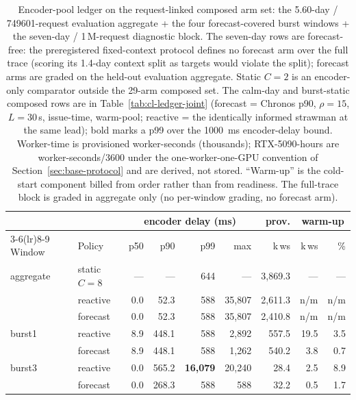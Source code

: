 \begin{table}[htbp]
\centering
\caption[Encoder-pool ledger, request-linked composed arm set]{Encoder-pool
ledger on the request-linked composed arm set: the 5.60-day /
\num{749601}-request evaluation aggregate + the four forecast-covered
burst windows + the seven-day / 1\,M-request diagnostic block. The
seven-day rows are forecast-free: the preregistered fixed-context
protocol defines no forecast arm over the full trace (scoring its
1.4-day context split as targets would violate the split); forecast arms
are graded on the held-out evaluation aggregate. Static $C{=}2$ is an
encoder-only comparator outside the 29-arm composed set. The calm-day
and burst-static composed
rows are in Table~\ref{tab:cl-ledger-joint} (forecast = Chronos p90, $\rho{=}15$,
$L{=}30$\,\si{\second}, issue-time, warm-pool; reactive = the identically
informed strawman at the same lead); bold marks a p99 over the
\SI{1000}{\milli\second} encoder-delay bound. Worker-time is provisioned
worker-seconds (thousands); RTX-5090-hours are worker-seconds/3600 under the
one-worker-one-GPU convention of Section~\ref{sec:base-protocol} and are
derived, not stored. ``Warm-up'' is the cold-start component billed from order
rather than from readiness. The full-trace block is graded in aggregate only
(no per-window grading, no forecast arm).}
\label{tab:cl-ledger-enc}
\footnotesize
\setlength{\tabcolsep}{3pt}
\begin{tabular}{@{}llrrrrrrr@{}}
\toprule
& & \multicolumn{4}{c}{encoder delay (\si{\milli\second})} & prov. &
\multicolumn{2}{c}{warm-up} \\
\cmidrule(lr){3-6}\cmidrule(lr){8-9}
Window & Policy & p50 & p90 & p99 & max & k\,ws & k\,ws & \% \\
\midrule
aggregate & static $C{=}8$ & --- & --- & 644 & --- & 3{,}869.3 & --- & --- \\
          & reactive       & 0.0 & 52.3 & 588 & 35{,}807 & 2{,}611.3 & n/m & n/m \\
          & forecast       & 0.0 & 52.3 & 588 & 35{,}807 & 2{,}410.8 & n/m & n/m \\
\midrule
burst1 & reactive & 8.9 & 448.1 & 588 & 2{,}892 & 557.5 & 19.5 & 3.5 \\
       & forecast & 8.9 & 448.1 & 588 & 1{,}262 & 540.2 & 3.8 & 0.7 \\
burst3 & reactive & 0.0 & 565.2 & \textbf{16{,}079} & 20{,}240 & 28.4 & 2.5 & 8.9 \\
       & forecast & 0.0 & 268.3 & 588 & 588 & 32.2 & 0.5 & 1.7 \\

\end{tabular}
\end{table}
